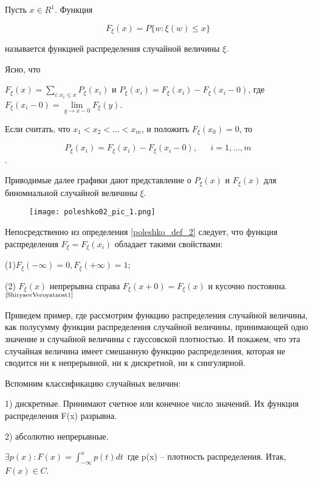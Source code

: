 \begin{definition} Пусть $x \in R^1$. Функция

$$F_{\xi}(x) = P\{ w: \xi(w) \leq x\}$$

называется функцией распределения случайной величины $\xi$. 

Ясно, что

$F_{\xi}(x) = \sum\limits_{i: x_i \leq x} P_{\xi}(x_i)$ и $P_{\xi}(x_i) = F_{\xi}(x_i) - F_{\xi}(x_i-0)$, где $F_{\xi}(x_i-0) = \lim\limits_{y \to x-0} F_{\xi}(y)$.

Если считать, что $x_1 < x_2 < ... < x_m$, и положить $F_{\xi}(x_0) = 0$, то

$$P_{\xi}(x_i) = F_{\xi}(x_i) - F_{\xi}(x_i-0), \ \ \ \ \ \ \ i = 1, ..., m$$.

\end{definition}

Приводимые далее графики дают представление о $P_{\xi}(x)$ и $F_{\xi}(x)$ для биномиальной случайной величины $\xi$.

\begin{figure}[h]
    \center \texttt{[image: poleshko02\_pic\_1.png]}
    \label{fig:image}
\end{figure}

Непосредственно из определения \ref{poleshko_def_2} следует, что функция распределения $F_{\xi} = F_{\xi}(x_i)$ обладает такими свойствами: 

(1)$F_{\xi}(- \infty)=0,F_{\xi}(+\infty)= 1$;

(2) $F_{\xi}(x)$ непрерывна справа $F_{\xi}(x+0) = F_{\xi}(x)$ и кусочно постоянна.$^{\text{\cite{ShiryaevVeroyatnost1}}}$


\begin{example} Приведем пример, где рассмотрим функцию распределения случайной величины, как полусумму функции распределения случайной величины, принимающей одно значение и случайной величины с гауссовской плотностью. И покажем, что эта случайная величина имеет смешанную функцию распределения, которая не сводится ни к непрерывной, ни к дискретной, ни к сингулярной.  
	\end{example}

Вспомним классификацию случайных величин:

1) дискретные. Принимают счетное или конечное число значений. Их функция распределения F(x) разрывна.

2) абсолютно непрерывные. 

$\exists p(x): F(x) = \int_{- \infty}^x p(t) dt \,$ где p(x) -- плотность распределения. Итак, $F(x) \in C$.

